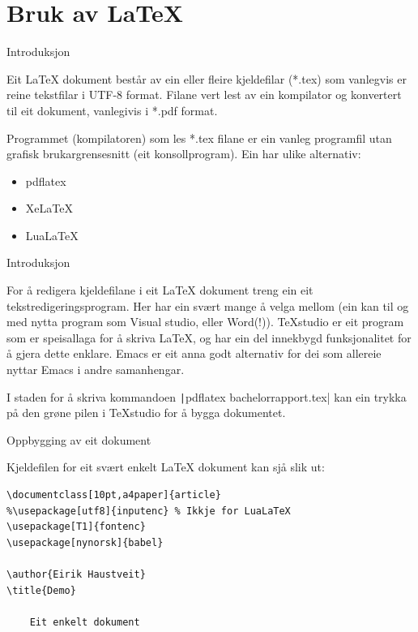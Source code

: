 \section{Bruk av \LaTeX}

\begin{frame}{Introduksjon}
	
	Eit \LaTeX{} dokument består av ein eller fleire kjeldefilar (*.tex) som vanlegvis er reine tekstfilar i UTF-8 format. Filane vert lest av ein kompilator og konvertert til eit dokument, vanlegivis i *.pdf format.
	
	Programmet (kompilatoren) som les *.tex filane er ein vanleg programfil utan grafisk brukargrensesnitt (eit konsollprogram). Ein har ulike alternativ:
	
	\begin{itemize}
		\item pdflatex
		\item XeLaTeX
		\item LuaLaTeX
	\end{itemize}
	
\end{frame}


\begin{frame}{Introduksjon}

  	
	
	For å redigera kjeldefilane i eit \LaTeX{} dokument treng ein eit tekstredigeringsprogram. Her har ein svært mange å velga mellom (ein kan til og med nytta program som Visual studio, eller Word(!)). TeXstudio er eit program som er speisallaga for å skriva \LaTeX{}, og har ein del innekbygd funksjonalitet for å gjera dette enklare. Emacs er eit anna godt alternativ for dei som allereie nyttar Emacs i andre samanhengar.
	
	I staden for å skriva kommandoen \texttt|pdflatex bachelorrapport.tex| kan ein trykka på den grøne pilen i TeXstudio for å bygga dokumentet.
	
\end{frame}

\begin{frame}[containsverbatim]{Oppbygging av eit dokument}
	
Kjeldefilen for eit svært enkelt \LaTeX{} dokument kan sjå slik ut:

	\begin{verbatim}
\documentclass[10pt,a4paper]{article}
%\usepackage[utf8]{inputenc} % Ikkje for LuaLaTeX
\usepackage[T1]{fontenc}
\usepackage[nynorsk]{babel}

\author{Eirik Haustveit}
\title{Demo}

	Eit enkelt dokument

	\end{verbatim}
	
\end{frame}


